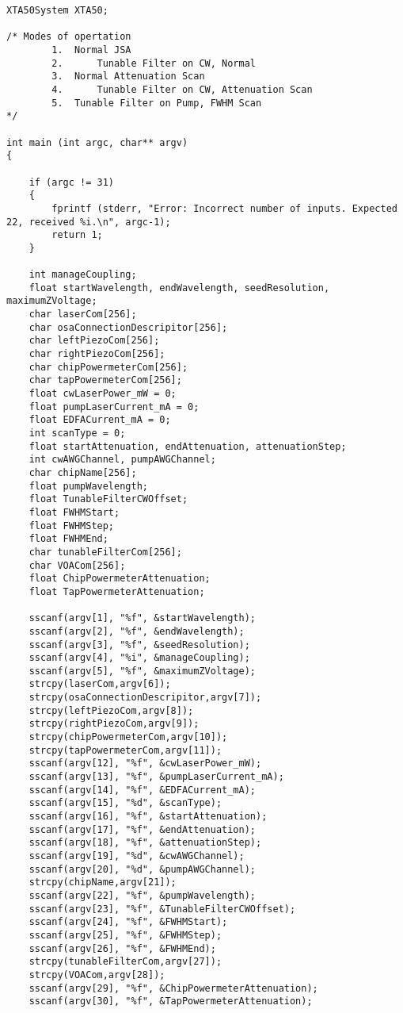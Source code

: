 \begin{lstlisting}
XTA50System XTA50;

/* Modes of opertation
        1.  Normal JSA
        2.      Tunable Filter on CW, Normal
        3.  Normal Attenuation Scan
        4.      Tunable Filter on CW, Attenuation Scan
        5.  Tunable Filter on Pump, FWHM Scan
*/

int main (int argc, char** argv)
{

	if (argc != 31)
	{
		fprintf (stderr, "Error: Incorrect number of inputs. Expected 22, received %i.\n", argc-1);
		return 1;
	}

    int manageCoupling;
    float startWavelength, endWavelength, seedResolution, maximumZVoltage;
    char laserCom[256];
    char osaConnectionDescripitor[256];
    char leftPiezoCom[256];
    char rightPiezoCom[256];
    char chipPowermeterCom[256];
    char tapPowermeterCom[256];
    float cwLaserPower_mW = 0;
    float pumpLaserCurrent_mA = 0;
    float EDFACurrent_mA = 0;
    int scanType = 0;
    float startAttenuation, endAttenuation, attenuationStep;
    int cwAWGChannel, pumpAWGChannel;
    char chipName[256];
    float pumpWavelength;
    float TunableFilterCWOffset;
    float FWHMStart;
    float FWHMStep;
    float FWHMEnd;
    char tunableFilterCom[256];
    char VOACom[256];
    float ChipPowermeterAttenuation;
    float TapPowermeterAttenuation;

    sscanf(argv[1], "%f", &startWavelength);
    sscanf(argv[2], "%f", &endWavelength);
    sscanf(argv[3], "%f", &seedResolution);
    sscanf(argv[4], "%i", &manageCoupling);
    sscanf(argv[5], "%f", &maximumZVoltage);
    strcpy(laserCom,argv[6]);
    strcpy(osaConnectionDescripitor,argv[7]);
    strcpy(leftPiezoCom,argv[8]);
    strcpy(rightPiezoCom,argv[9]);
    strcpy(chipPowermeterCom,argv[10]);
    strcpy(tapPowermeterCom,argv[11]);
    sscanf(argv[12], "%f", &cwLaserPower_mW);
    sscanf(argv[13], "%f", &pumpLaserCurrent_mA);
    sscanf(argv[14], "%f", &EDFACurrent_mA);
    sscanf(argv[15], "%d", &scanType);
    sscanf(argv[16], "%f", &startAttenuation);
    sscanf(argv[17], "%f", &endAttenuation);
    sscanf(argv[18], "%f", &attenuationStep);
    sscanf(argv[19], "%d", &cwAWGChannel);
    sscanf(argv[20], "%d", &pumpAWGChannel);
    strcpy(chipName,argv[21]);
    sscanf(argv[22], "%f", &pumpWavelength);
    sscanf(argv[23], "%f", &TunableFilterCWOffset);
    sscanf(argv[24], "%f", &FWHMStart);
    sscanf(argv[25], "%f", &FWHMStep);
    sscanf(argv[26], "%f", &FWHMEnd);
    strcpy(tunableFilterCom,argv[27]);
    strcpy(VOACom,argv[28]);
    sscanf(argv[29], "%f", &ChipPowermeterAttenuation);
    sscanf(argv[30], "%f", &TapPowermeterAttenuation);


\end{lstlisting}
